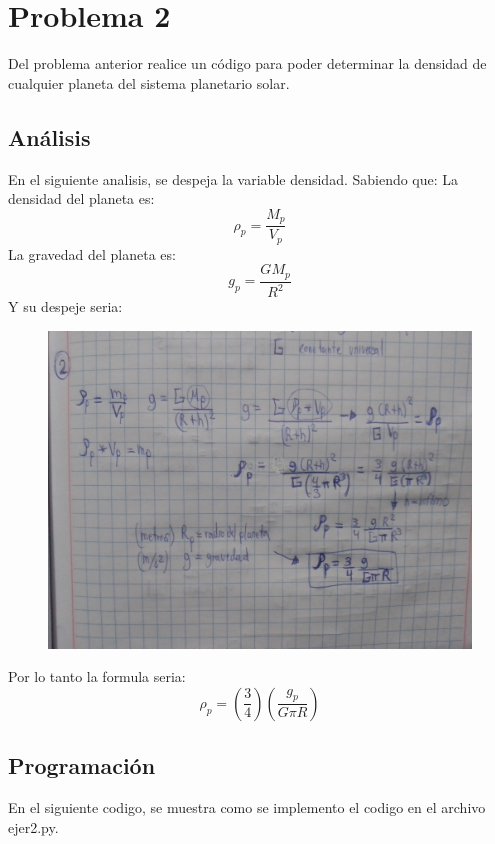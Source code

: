 \documentclass[a4paper,12pt]{article}
\begin{document}
    \section{Problema 2}
        Del problema anterior realice un código para poder 
        determinar la densidad de cualquier planeta del 
        sistema planetario solar.    
    \subsection{Análisis}
    En el siguiente analisis, se despeja la variable densidad.
    Sabiendo que:
    La densidad del planeta es:
    \begin{equation}
        \rho_p = \frac{M_p}{V_p}
    \end{equation}
    La gravedad del planeta es:
    \begin{equation}
        g_p = \frac{GM_p}{R^2}
    \end{equation}
    Y su despeje seria:
    \begin{figure}[!htbp]
        \centering
        \includegraphics[scale=0.2]{ejer2fc.jpg}
    \end{figure}    

    Por lo tanto la formula seria:
    \begin{equation}
        \rho_p = (\frac{3}{4})(\frac{g_p}{G \pi R})
    \end{equation}   
    \subsection{Programación}
    En el siguiente codigo, se muestra como se implemento el codigo en el archivo ejer2.py.
    
    \newpage
\end{document}
